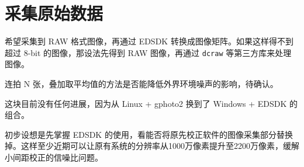 
\section{采集原始数据} %
\label{sec:capture}


希望采集到 RAW 格式图像，再通过 EDSDK 转换成图像矩阵。如果这样得不到超过 8-bit 的图像，那设法先得到 RAW 图像，再通过 \texttt{dcraw} 等第三方库来处理图像。

连拍 N 张，叠加取平均值的方法是否能降低外界环境噪声的影响，待确认。

这块目前没有任何进展，因为从 Linux + gphoto2 换到了 Windows + EDSDK 的组合。

初步设想是先掌握 EDSDK 的使用，看能否将原先校正软件的图像采集部分替换掉。这样至少近期可以让原有系统的分辨率从1000万像素提升至2200万像素，缓解小间距校正的信噪比问题。

